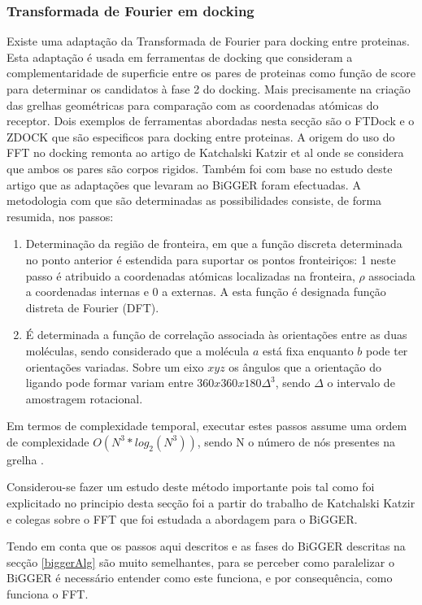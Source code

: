 \subsubsection{Transformada de Fourier em docking}
\label{fft}
Existe uma adaptação da Transformada de Fourier para docking entre proteinas. Esta adaptação é usada em ferramentas de docking que consideram a complementaridade de superficie entre os pares de proteinas como função de score para determinar os candidatos à fase 2 do docking. Mais precisamente na criação das grelhas geométricas para comparação com as coordenadas atómicas do receptor. Dois exemplos de ferramentas abordadas nesta secção são o FTDock e o ZDOCK que são especificos para docking entre proteinas.
A origem do uso do FFT no docking remonta ao artigo de Katchalski Katzir et al \cite{katchalski1992} onde se considera que ambos os pares são corpos rigidos. Também foi com base no estudo deste artigo que as adaptações que levaram ao BiGGER foram efectuadas\cite{biggerPaper}.
 A metodologia com que são determinadas as possibilidades consiste, de forma resumida, nos passos:
\begin{enumerate}
	\item Determinação da região de fronteira, em que a função discreta determinada no ponto anterior é estendida para suportar os pontos fronteiriços: 1 neste passo é atribuido a coordenadas atómicas localizadas na fronteira, $\rho$ associada a coordenadas internas e 0 a externas. A esta função é designada função distreta de Fourier (DFT).
	
	\item É determinada a função de correlação associada às orientações entre as duas moléculas, sendo considerado que a molécula $a$ está fixa enquanto $b$ pode ter orientações variadas. Sobre um eixo $xyz$ os ângulos que a orientação do ligando pode formar variam entre $360x360x180\Delta^{3}$, sendo $\Delta$ o intervalo de amostragem rotacional.

\end{enumerate} 
Em termos de complexidade temporal, executar estes passos assume uma ordem de complexidade $O(N^{3}*log_2(N^{3}))$, sendo N o número de nós presentes na grelha \cite{teseProf}.

Considerou-se fazer um estudo deste método importante pois tal como foi explicitado no principio desta secção foi a partir do trabalho de Katchalski Katzir e colegas sobre o FFT que foi estudada a abordagem para o BiGGER\cite{teseProf}. 

Tendo em conta que os passos aqui descritos e as fases do BiGGER descritas na secção \ref{biggerAlg} são muito semelhantes, para se perceber como paralelizar o BiGGER é necessário entender como este funciona, e por consequência, como funciona o FFT. 

